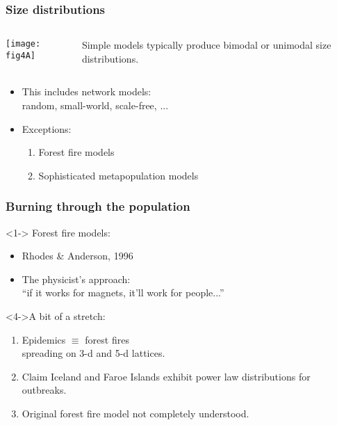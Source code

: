 
\begin{frame}
  \frametitle{Size distributions}

  \begin{columns}
    \begin{column}{0.5\textwidth}
      \texttt{[image: fig4A]}      
    \end{column}
    \begin{column}{0.4\textwidth}
      Simple models typically produce
      \alert{bimodal} or \alert{unimodal} size distributions.
    \end{column}
  \end{columns}

  \begin{itemize}
  \item<2-> This \alert{includes} network models:\\ random, small-world, scale-free, ...
  \item<3-> Exceptions:
    \begin{enumerate}
    \item<4-> Forest fire models
    \item<5-> Sophisticated metapopulation models
    \end{enumerate}
  \end{itemize}
 
\end{frame}



\begin{frame}
  \frametitle{Burning through the population}

  \begin{block}<1-> {Forest fire models:\cite{rhodes1996a} }
    \begin{itemize}
    \item<2-> Rhodes \& Anderson, 1996
    \item<3-> The physicist's approach:\\
      \alert{``if it works for magnets, it'll work for people...''} 
    \end{itemize}
   \end{block}

   \begin{block}<4->{A bit of a stretch:}
     \begin{enumerate}
     \item<5->
       Epidemics $\equiv$ forest fires\\ spreading on
       3-d and 5-d lattices.
     \item<6-> 
       Claim Iceland and Faroe Islands exhibit power law
       distributions for outbreaks.
     \item<7-> 
       Original forest fire model not completely understood.
     \end{enumerate}
   \end{block}

\end{frame}

